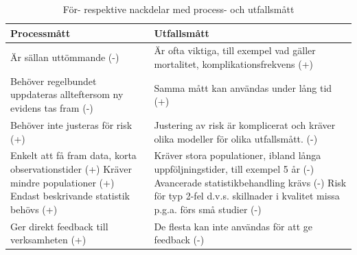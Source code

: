 \begin{table}[h]
\centering
\caption{För- respektive nackdelar med process- och utfallsmått}
\label{tab:fornack}
\begin{tabular}{|p{7cm}|p{7cm}|}
\hline
Processmått                                                                                                               & Utfallsmått                                                                                                                                                                                        \\ \hline
Är sällan uttömmande (-)                                                                                                  & Är ofta viktiga, till exempel vad gäller mortalitet, komplikationsfrekvens (+)                                                                                                                            \\ \hline
Behöver regelbundet uppdateras allteftersom ny evidens tas fram (-)                                                       & Samma mått kan användas under lång tid (+)                                                                                                                                                         \\ \hline
Behöver inte justeras för risk (+)                                                                                        & Justering av risk är komplicerat och kräver olika modeller för olika utfallsmått. (-)                                                                                                              \\ \hline
Enkelt att få fram data, korta observationstider (+) \newline Kräver mindre populationer (+) \newline Endast beskrivande statistik behövs (+) & Kräver stora populationer, ibland långa uppföljningstider, till exempel 5 år (-) \newline Avancerade statistikbehandling krävs (-) \newline Risk för typ 2-fel d.v.s. skillnader i kvalitet missa p.g.a. förs små studier (-) \\ \hline
Ger direkt feedback till verksamheten (+)                                                                                 & De flesta kan inte användas för att ge feedback (-)                                                                                                                                                \\ \hline
\end{tabular}
\end{table}

